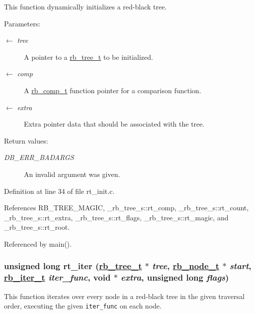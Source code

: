 This function dynamically initializes a red-black tree.

\begin{Desc}
\item[Parameters:]
\begin{description}
\item[\mbox{$\leftarrow$} {\em tree}]A pointer to a \hyperlink{group__dbprim__rbtree_ga0}{rb\_\-tree\_\-t} to be initialized. \item[\mbox{$\leftarrow$} {\em comp}]A \hyperlink{group__dbprim__rbtree_ga3}{rb\_\-comp\_\-t} function pointer for a comparison function. \item[\mbox{$\leftarrow$} {\em extra}]Extra pointer data that should be associated with the tree.\end{description}
\end{Desc}
\begin{Desc}
\item[Return values:]
\begin{description}
\item[{\em DB\_\-ERR\_\-BADARGS}]An invalid argument was given.\end{description}
\end{Desc}


Definition at line 34 of file rt\_\-init.c.

References RB\_\-TREE\_\-MAGIC, \_\-rb\_\-tree\_\-s::rt\_\-comp, \_\-rb\_\-tree\_\-s::rt\_\-count, \_\-rb\_\-tree\_\-s::rt\_\-extra, \_\-rb\_\-tree\_\-s::rt\_\-flags, \_\-rb\_\-tree\_\-s::rt\_\-magic, and \_\-rb\_\-tree\_\-s::rt\_\-root.

Referenced by main().\hypertarget{group__dbprim__rbtree_ga11}{
\subsubsection[rt\_\-iter]{\setlength{\rightskip}{0pt plus 5cm}unsigned long rt\_\-iter (\hyperlink{struct__rb__tree__s}{rb\_\-tree\_\-t} $\ast$ {\em tree}, \hyperlink{struct__rb__node__s}{rb\_\-node\_\-t} $\ast$ {\em start}, \hyperlink{group__dbprim__rbtree_ga2}{rb\_\-iter\_\-t} {\em iter\_\-func}, void $\ast$ {\em extra}, unsigned long {\em flags})}}
\label{group__dbprim__rbtree_ga11}


This function iterates over every node in a red-black tree in the given traversal order, executing the given {\tt iter\_\-func} on each node.

